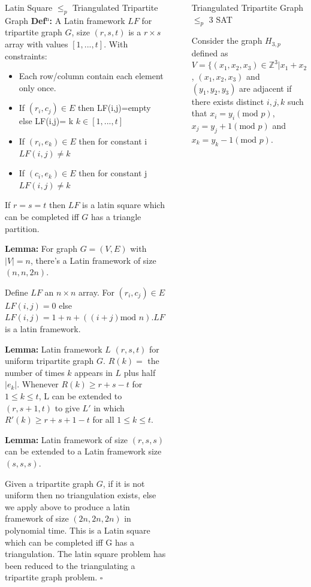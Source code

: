 \documentclass[final]{beamer}
\newlength{\sepwidth}
\newlength{\colwidth}
\newcounter{row}
\newcounter{col}
\newcommand{\separatorcolumn}{\begin{column}{\sepwidth}\end{column}}
\begin{document}
\begin{frame}[t]
\begin{columns}[t]
\begin{column}{\colwidth}
\begin{block}{Latin Square $\leq_p$ Triangulated Tripartite Graph}
\textbf{Def$^{\text{n}}$:} A Latin framework $LF$ for tripartite graph $G$, size $(r,s,t)$ is a $r \times s$ array with values $[1,...,t]$. With constraints:
\begin{itemize}
\item{Each row/column contain each element only once.}
\item{If $(r_i,c_j)\in E$ then LF(i,j)=empty else LF(i,j)= k $k\in [1,...,t]$}
\item{If $(r_i,e_k)\in E$  then for constant i $LF(i,j)\neq k$}
\item{If $(c_i,e_k)\in E$  then for constant j $LF(i,j)\neq k$}
\end{itemize}
If $r=s=t$ then $LF$ is a latin square which can be completed iff $G$ has a triangle partition.

\textbf{Lemma:} For graph $G=(V,E)$ with $|V|=n$, there's a Latin framework of size $(n,n,2n)$.

Define $LF$ an $n \times n$ array. For $(r_i,c_j)\in E$ $LF(i,j)=0$ else $LF(i,j)=1+n+((i+j)\text{mod }n)$.$ LF$ is a latin framework. 

\textbf{Lemma:} Latin framework $L$  $(r,s,t)$ for uniform tripartite graph $G$. $R(k) =$ the number of times $k$ appears in $L$ plus half $|e_k|$. Whenever $R(k)\ge r+s-t$ for $1 \le k \le t$, L can be extended to $(r,s+1,t)$ to give $L'$ in which $R'(k)\ge r + s+1-t$ for all $1\le k \le t$.

\textbf{Lemma:} Latin framework of size $(r,s,s)$ can be extended to a Latin framework size $(s,s,s)$.

Given a tripartite graph $G$, if it is not uniform then no triangulation exists, else we apply above to produce a latin framework of size $(2n,2n,2n)$ in polynomial time. This is a Latin square which can be completed iff G has a triangulation. The latin square problem has been reduced to the triangulating a tripartite graph problem. $\square$

  \end{block}

\end{column}

\separatorcolumn

\begin{column}{\colwidth}
  \begin{block}{Triangulated Tripartite Graph $\leq_p$ 3 SAT}

Consider the graph $H_{3,p}$ defined as $V=\{(x_1,x_2,x_3)\in \mathbb{Z}^3|x_1+x_2+x_3=0(\text{mod }p )\}$, $(x_1,x_2,x_3)$ and $(y_1,y_2,y_3)$ are adjacent if there exists distinct $i,j,k$ such that $x_i=y_i (\text{mod }p )$, $x_j=y_j+1 (\text{mod }p )$ and $x_k=y_k-1 (\text{mod }p )$.


\end{block}
\end{column}
\end{columns}
\end{frame}
\end{document}
